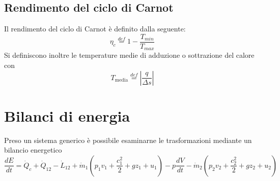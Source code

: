 \documentclass[a4paper,12pt]{article}
\begin{document}
\subsection{Rendimento del ciclo di Carnot}
\label{subsec:rendimento_carnot}
Il rendimento del ciclo di Carnot è definito dalla seguente:
\begin{equation}
    \eta_c \stackrel{def}{=} 1 - \frac{T_{min}}{T_{max}}
\end{equation}
Si definiscono inoltre le temperature medie di adduzione o sottrazione del calore con
\begin{equation}
    T_{\text{media}} \stackrel{def}{=} \left|\frac{q}{\Delta s}\right|
\end{equation}

\section{Bilanci di energia}
\label{sec:bilanci_energia}
Preso un sistema generico è possibile esaminarne le trasformazioni mediante un bilancio
energetico
\begin{equation}
    \label{eq:bilancio_energetico}
    \frac{dE}{dt} = \dot{Q}_c + \dot{Q}_{12} - \dot{L}_{12} + \dot{m}_1
    (p_1v_1 + \frac{c^2_1}{2} + gz_1 + u_1) -p\frac{dV}{dt} - \dot{m}_2
    (p_2v_2 + \frac{c^2_2}{2} + gz_2 + u_2)
\end{equation}
\end{document}
